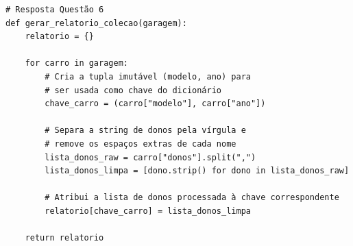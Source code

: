 \ifmostrarGabarito
\begin{verbatim}
# Resposta Questão 6
def gerar_relatorio_colecao(garagem):
    relatorio = {}
    
    for carro in garagem:
        # Cria a tupla imutável (modelo, ano) para 
        # ser usada como chave do dicionário
        chave_carro = (carro["modelo"], carro["ano"])
        
        # Separa a string de donos pela vírgula e 
        # remove os espaços extras de cada nome
        lista_donos_raw = carro["donos"].split(",")
        lista_donos_limpa = [dono.strip() for dono in lista_donos_raw]
        
        # Atribui a lista de donos processada à chave correspondente
        relatorio[chave_carro] = lista_donos_limpa
        
    return relatorio
\end{verbatim}
\fi
